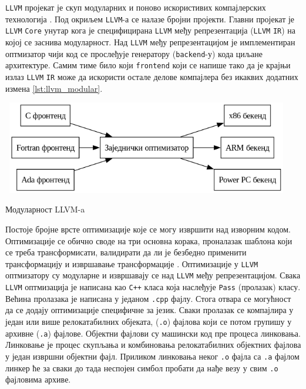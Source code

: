 \verb|LLVM| пројекат је скуп модуларних и поново искористивих компајлерских технологија \cite{llvm}. Под окриљем \verb|LLVM|-а
се налазе бројни пројекти. Главни пројекат је \verb|LLVM| \verb|Core| унутар кога је специфицирана \verb|LLVM|
међу репрезентација (\verb|LLVM| \verb|IR|) на којој се заснива модуларност. Над \verb|LLVM| међу репрезентацијом
је имплементиран оптмизатор чији код се прослеђује генератору (\verb|backend|-у) кода циљане архитектуре. Самим тиме 
било који \verb|frontend| који се напише тако да је крајњи излаз \verb|LLVM| \verb|IR| може да искористи 
остале делове компајлера без икаквих додатних измена \ref{lst:llvm_modular}.

\begin{listing}[H]
\begin{center}
\includegraphics[width=5in, height=1.6in]{assets/images/modern_compiler_design.png}
\end{center}
\caption{Модуларност LLVM-a}
\label{lst:llvm_modular}
\end{listing}

Постоје бројне врсте оптимизације које се могу извршити над изворним кодом. Оптимизације се обично своде 
на три основна корака, проналазак шаблона који се треба трансформисати, валидирати да ли је безбедно применити 
трансформацију и извршавање трансформације \cite{oss-architecture}. Оптимизације у \verb|LLVM| оптмизатору су модуларне и извршавају 
се над \verb|LLVM| међу репрезентацијом. Свака \verb|LLVM| оптмизација је написана као \verb|C++| класа која 
наслеђује \verb|Pass| (пролазак) класу. Већина пролазака је написана у једаном \verb|.cpp| фајлу.
Стога отвара се могућност да се додају оптимизације специфичне за језик. Сваки пролазак се компајлира у један 
или више релокатабилних објеката, (\verb|.o|) фајлова који се потом групишу у архивне (\verb|.a|) фајлове. Објектни фајлови 
су машински код пре процеса линковања. Линковање је процес скупљања и комбиновања релокатабилних објектних фајлова
у један извршни објектни фајл. Приликом линковања неког \verb|.o| фајла са \verb|.a| фајлом линкер ће 
за сваки до тада неспојен симбол пробати да нађе везу у свим \verb|.o| фајловима архиве.


